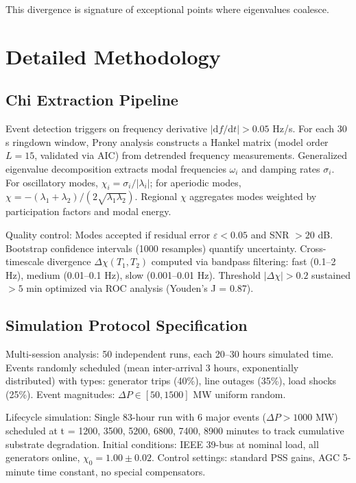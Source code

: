 \documentclass[11pt,letterpaper]{article}
\begin{document}
This divergence is signature of exceptional points where eigenvalues coalesce.

\section{Detailed Methodology}

\subsection{Chi Extraction Pipeline}

Event detection triggers on frequency derivative $|\mathrm{d}f/\mathrm{d}t| > 0.05$ Hz/s. For each 30 s ringdown window, Prony analysis constructs a Hankel matrix (model order $L=15$, validated via AIC) from detrended frequency measurements. Generalized eigenvalue decomposition extracts modal frequencies $\omega_i$ and damping rates $\sigma_i$. For oscillatory modes, $\chi_i = \sigma_i/|\lambda_i|$; for aperiodic modes, $\chi = -(\lambda_1+\lambda_2)/(2\sqrt{\lambda_1\lambda_2})$. Regional $\chi$ aggregates modes weighted by participation factors and modal energy.

Quality control: Modes accepted if residual error $\varepsilon < 0.05$ and SNR $> 20$ dB. Bootstrap confidence intervals (1000 resamples) quantify uncertainty. Cross-timescale divergence $\Delta\chi(T_1,T_2)$ computed via bandpass filtering: fast (0.1--2 Hz), medium (0.01--0.1 Hz), slow (0.001--0.01 Hz). Threshold $|\Delta\chi| > 0.2$ sustained $> 5$ min optimized via ROC analysis (Youden's J = 0.87).

\subsection{Simulation Protocol Specification}

Multi-session analysis: 50 independent runs, each 20--30 hours simulated time. Events randomly scheduled (mean inter-arrival 3 hours, exponentially distributed) with types: generator trips (40\%), line outages (35\%), load shocks (25\%). Event magnitudes: $\Delta P \in [50, 1500]$ MW uniform random.

Lifecycle simulation: Single 83-hour run with 6 major events ($\Delta P > 1000$ MW) scheduled at t = 1200, 3500, 5200, 6800, 7400, 8900 minutes to track cumulative substrate degradation. Initial conditions: IEEE 39-bus at nominal load, all generators online, $\chi_0 = 1.00 \pm 0.02$. Control settings: standard PSS gains, AGC 5-minute time constant, no special compensators.
\end{document}
